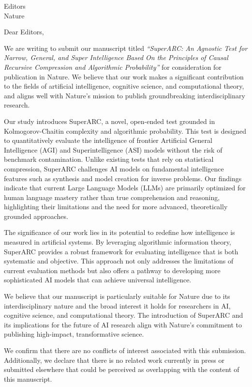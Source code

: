\documentclass[11pt]{letter}
\begin{document}
\begin{letter}{Editors\\Nature}

\vspace*{1cm}

\opening{Dear Editors,}

We are writing to submit our manuscript titled \textit{``SuperARC: An Agnostic Test for Narrow, General, and Super Intelligence Based On the Principles of Causal Recursive Compression and Algorithmic Probability''} for consideration for publication in Nature. We believe that our work makes a significant contribution to the fields of artificial intelligence, cognitive science, and computational theory, and aligns well with Nature's mission to publish groundbreaking interdisciplinary research.

Our study introduces SuperARC, a novel, open-ended test grounded in Kolmogorov-Chaitin complexity and algorithmic probability. This test is designed to quantitatively evaluate the intelligence of frontier Artificial General Intelligence (AGI) and Superintelligence (ASI) models without the risk of benchmark contamination. Unlike existing tests that rely on statistical compression, SuperARC challenges AI models on fundamental intelligence features such as synthesis and model creation for inverse problems. Our findings indicate that current Large Language Models (LLMs) are primarily optimized for human language mastery rather than true comprehension and reasoning, highlighting their limitations and the need for more advanced, theoretically grounded approaches.

The significance of our work lies in its potential to redefine how intelligence is measured in artificial systems. By leveraging algorithmic information theory, SuperARC provides a robust framework for evaluating intelligence that is both systematic and objective. This approach not only addresses the limitations of current evaluation methods but also offers a pathway to developing more sophisticated AI models that can achieve universal intelligence.

We believe that our manuscript is particularly suitable for Nature due to its interdisciplinary nature and the broad interest it holds for researchers in AI, cognitive science, and computational theory. The introduction of SuperARC and its implications for the future of AI research align with Nature's commitment to publishing high-impact, transformative science.

We confirm that there are no conflicts of interest associated with this submission. Additionally, we declare that there is no related work currently in press or submitted elsewhere that could be perceived as overlapping with the content of this manuscript.


\end{letter}
\end{document}
